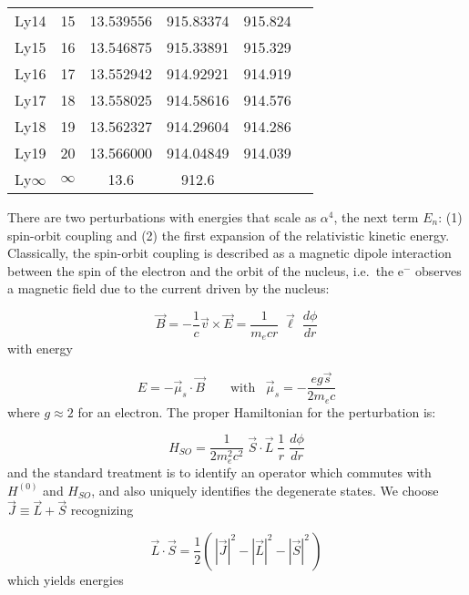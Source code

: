 \documentclass[graybox]{svmult}
\def\ohf{\frac{1}{2}}
\def\ltp{\left ( \,}
\def\rtp{\, \right  ) }
\begin{document}
\begin{table}[ht]
\begin{center}
\begin{tabular}{cccccc}
Ly14&                 15&       13.539556&       915.83374& 915.824\\
Ly15&                 16&       13.546875&       915.33891& 915.329\\
Ly16&                 17&       13.552942&       914.92921& 914.919\\
Ly17&                 18&       13.558025&       914.58616& 914.576\\
Ly18&                 19&       13.562327&       914.29604& 914.286\\
Ly19&                 20&       13.566000&       914.04849& 914.039\\
Ly$\infty$&         $\infty$&   13.6&            912.6    & \\
\hline
\end{tabular}
\end{center}
\end{table}


There are two perturbations with energies that scale
as $\alpha^4$, the next term $E_n$:
(1) spin-orbit coupling and
(2) the first expansion of the relativistic kinetic energy.
Classically, the spin-orbit coupling is described as 
a magnetic dipole interaction between the spin of the electron
and the orbit of the nucleus, i.e.\ 
the e$^{-}$ observes a magnetic field due
to the current driven by the nucleus:

\begin{equation}
\vec B = - \frac{1}{c} \vec v \times \vec 
E = \frac{1}{m_e c r} \; \vec \ell \;
\frac{d\phi}{dr}
\end{equation}
with energy

\begin{equation}
E = - \vec \mu_s \cdot \vec B  \quad\quad \text{with} \;\;\; 
\vec \mu_s = -\frac{e g \vec s}{2 m_e c}
\end{equation}
where $g \approx 2$ for an electron.
The proper Hamiltonian for the perturbation is:

\begin{equation}
H_{SO} = \frac{1}{2 m_e^2 c^2} \; \vec S \cdot \vec L \; \frac{1}{r} \;
\frac{d\phi}{dr}
\end{equation}
and the standard treatment is to 
identify an operator which commutes with 
$H^{(0)}$ and $H_{SO}$, and also
uniquely identifies the degenerate states.
We choose  $\vec J \equiv \vec L + \vec S$
recognizing

\begin{equation*}
\vec L \cdot \vec S = \ohf \ltp |\vec J|^2 - |\vec L|^2 - |\vec S|^2 \rtp
\end{equation*}
which yields energies
\end{document}
